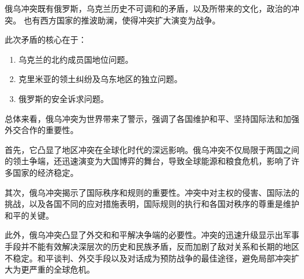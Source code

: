 俄乌冲突既有俄罗斯，乌克兰历史不可调和的矛盾，以及所带来的文化，政治的冲突。
也有西方国家的推波助澜，使得冲突扩大演变为战争。

此次矛盾的核心在于：
\begin{enumerate}
    \item 乌克兰的北约成员国地位问题。
    \item 克里米亚的领土纠纷及乌东地区的独立问题。
    \item 俄罗斯的安全诉求问题。
\end{enumerate}

总体来看，俄乌冲突为世界带来了警示，强调了各国维护和平、坚持国际法和加强外交合作的重要性。

首先，它凸显了地区冲突在全球化时代的深远影响。俄乌冲突不仅局限于两国之间的领土争端，还迅速演变为大国博弈的舞台，导致全球能源和粮食危机，影响了许多国家的经济稳定。

其次，俄乌冲突揭示了国际秩序和规则的重要性。冲突中对主权的侵害、国际法的挑战，以及各国不同的应对措施表明，国际规则的执行和各国对秩序的尊重是维护和平的关键。

此外，俄乌冲突凸显了外交和和平解决争端的必要性。冲突的迅速升级显示出军事手段并不能有效解决深层次的历史和民族矛盾，反而加剧了敌对关系和长期的地区不稳定。和平谈判、外交手段以及对话成为预防战争的最佳途径，避免局部冲突扩大为更严重的全球危机。